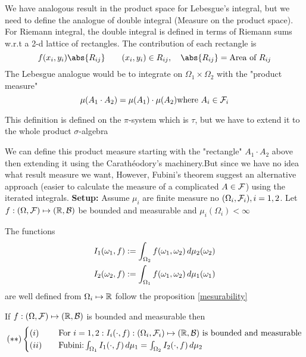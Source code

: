 We have analogous result in the product space for Lebesgue's integral, but we need to define the analogue of double integral (Measure on the product space).\\
For Riemann integral, the double integral is defined in terms of Riemann sums w.r.t a 2-d lattice of rectangles. The contribution of each rectangle is 
\begin{equation*}
    f(x_i, y_i)\abs{R_{ij}} \qquad (x_i, y_i)\in R_{ij}, \quad \abs{R_{ij}}=\text{Area of }R_{ij}
\end{equation*}
The Lebesgue analogue would be to integrate on $\Omega_1\times \Omega_2$ with the "product measure" 
\begin{equation*}
    \mu(A_1 \cdot A_2) = \mu(A_1) \cdot \mu(A_2) \text{where }A_i\in\mathcal{F}_i
\end{equation*}
\begin{rem}
This definition is defined on the $\pi$-system which is $\tau$, but we have to extend it to the whole product $\sigma$-algebra
\end{rem}
We can define this product measure starting with the "rectangle" $A_1 \cdot A_2$ above then extending it using the Carathéodory's machinery.But since we have no idea what result measure we want, However, Fubini's theorem suggest an alternative approach (easier to calculate the measure of a complicated $A\in \mathcal{F}$) using the iterated integrals.
\newpage
\textbf{Setup:} Assume $\mu_i$ are finite measure no $(\Omega_i, \mathcal{F}_i), i=1,2$. Let $f: (\Omega, \mathcal{F}) \mapsto (\mathbb{R}, \mathcal{B})$ be bounded and measurable and $\mu_i(\Omega_i) < \infty$
\begin{dfn}
The functions 
\begin{align*}
    I_1(\omega_1, f) := \int_{\Omega_2} f(\omega_1, \omega_2) \mathop{}\!d \mu_2 (\omega_2) \\
    I_2(\omega_2, f) := \int_{\Omega_1} f(\omega_1, \omega_2) \mathop{}\!d \mu_1 (\omega_1)
\end{align*}are well defined from $\Omega_i \mapsto \mathbb{R}$ follow the proposition \ref{mesurability}
\end{dfn}
\begin{lem}If $f:(\Omega, \mathcal{F}) \mapsto (\mathbb{R}, \mathcal{B})$ is bounded and measurable then 
\begin{align*}
(**)\begin{cases}
    (i)\quad& \text{For } i=1,2: I_i(\cdot, f): (\Omega_i, \mathcal{F}_i) \mapsto (\mathbb{R}, \mathcal{B}) \text{ is bounded and measurable} \\
    (ii)\quad& \text{Fubini:} \int_{\Omega_1} I_1(\cdot, f) \mathop{}\!d \mu_1 = \int_{\Omega_2} I_2(\cdot, f) \mathop{}\!d \mu_2
\end{cases}
\end{align*}
\end{lem}
